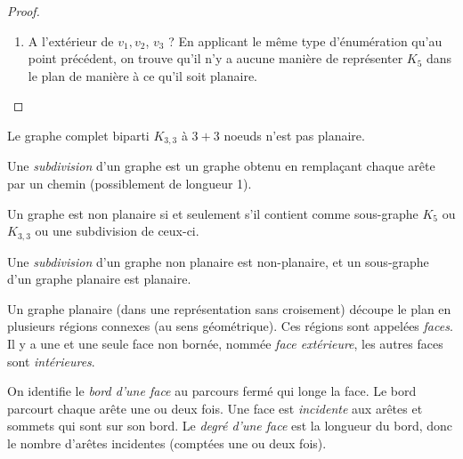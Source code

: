 \begin{mytheo}
\begin{proof}
\begin{enumerate}
\begin{enumerate}
\begin{center}
      \end{center}
    \end{enumerate}
    \item A l'extérieur de $v_1, v_2$, $v_3$ ? En applicant le même type d'énumération qu'au point précédent, on trouve qu'il n'y a aucune manière de représenter $K_5$ dans le plan de manière à ce qu'il soit planaire.
  \end{enumerate}
  \end{proof}
\end{mytheo}



\begin{mytheo}
Le graphe complet biparti $K_{3,3}$ à $3+3$ noeuds n'est pas planaire.
\end{mytheo}

\begin{mydef}
  Une \emph{subdivision} d'un graphe est un graphe obtenu en remplaçant chaque arête
  par un chemin (possiblement de longueur 1).
\end{mydef}

\begin{mytheo} [Kuratowski]
  Un graphe est non planaire si et seulement s'il contient comme sous-graphe $K_5$ ou $K_{3,3}$ ou une subdivision de ceux-ci.
\end{mytheo}

\begin{mytheo}
  Une \emph{subdivision} d'un graphe non planaire est non-planaire,
  et un sous-graphe d'un graphe planaire est planaire.
\end{mytheo}

\begin{mydef}
  Un graphe planaire (dans une représentation sans croisement) découpe le plan en plusieurs régions connexes (au sens géométrique). Ces régions sont appelées \emph{faces}. Il y a une et une seule face non bornée, nommée \emph{face extérieure}, les autres faces sont \emph{intérieures}.
\end{mydef}

\begin{mydef}
  On identifie le \emph{bord d'une face} au parcours fermé qui longe la face. Le bord parcourt chaque arête une ou deux fois.
  Une face est \emph{incidente} aux arêtes et sommets qui sont sur son bord.
  Le \emph{degré d'une face} est la longueur du bord, donc le nombre d'arêtes incidentes (comptées une ou deux fois).
\end{mydef}

